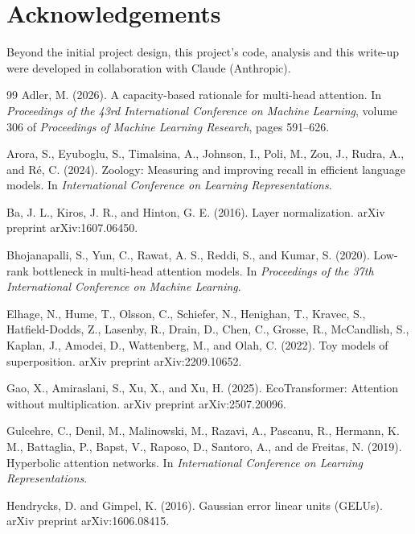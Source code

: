 \documentclass[11pt]{article}
\begin{document}
\section*{Acknowledgements}

Beyond the initial project design, this project's code, analysis and this write-up were developed in collaboration with Claude (Anthropic).

\begin{thebibliography}{99}
\setlength{\itemsep}{0.6em}
Adler, M. (2026).
A capacity-based rationale for multi-head attention.
In \emph{Proceedings of the 43rd International Conference on Machine Learning}, volume 306 of \emph{Proceedings of Machine Learning Research}, pages 591--626.

Arora, S., Eyuboglu, S., Timalsina, A., Johnson, I., Poli, M., Zou, J., Rudra, A., and R\'e, C. (2024).
Zoology: Measuring and improving recall in efficient language models.
In \emph{International Conference on Learning Representations}.

Ba, J. L., Kiros, J. R., and Hinton, G. E. (2016).
Layer normalization.
arXiv preprint arXiv:1607.06450.

Bhojanapalli, S., Yun, C., Rawat, A. S., Reddi, S., and Kumar, S. (2020).
Low-rank bottleneck in multi-head attention models.
In \emph{Proceedings of the 37th International Conference on Machine Learning}.

Elhage, N., Hume, T., Olsson, C., Schiefer, N., Henighan, T., Kravec, S., Hatfield-Dodds, Z., Lasenby, R., Drain, D., Chen, C., Grosse, R., McCandlish, S., Kaplan, J., Amodei, D., Wattenberg, M., and Olah, C. (2022).
Toy models of superposition.
arXiv preprint arXiv:2209.10652.

Gao, X., Amiraslani, S., Xu, X., and Xu, H. (2025).
EcoTransformer: Attention without multiplication.
arXiv preprint arXiv:2507.20096.

Gulcehre, C., Denil, M., Malinowski, M., Razavi, A., Pascanu, R., Hermann, K. M., Battaglia, P., Bapst, V., Raposo, D., Santoro, A., and de Freitas, N. (2019).
Hyperbolic attention networks.
In \emph{International Conference on Learning Representations}.

Hendrycks, D. and Gimpel, K. (2016).
Gaussian error linear units (GELUs).
arXiv preprint arXiv:1606.08415.


\end{thebibliography}
\end{document}
